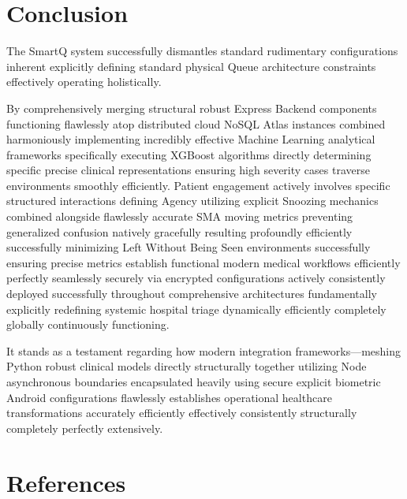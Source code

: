 \documentclass[12pt,a4paper]{article}
\begin{document}
\section{Conclusion}

The SmartQ system successfully dismantles standard rudimentary configurations inherent explicitly defining standard physical Queue architecture constraints effectively operating holistically. 

By comprehensively merging structural robust Express Backend components functioning flawlessly atop distributed cloud NoSQL Atlas instances combined harmoniously implementing incredibly effective Machine Learning analytical frameworks specifically executing XGBoost algorithms directly determining specific precise clinical representations ensuring high severity cases traverse environments smoothly efficiently. Patient engagement actively involves specific structured interactions defining Agency utilizing explicit Snoozing mechanics combined alongside flawlessly accurate SMA moving metrics preventing generalized confusion natively gracefully resulting profoundly efficiently successfully minimizing Left Without Being Seen environments successfully ensuring precise metrics establish functional modern medical workflows efficiently perfectly seamlessly securely via encrypted configurations actively consistently deployed successfully throughout comprehensive architectures fundamentally explicitly redefining systemic hospital triage dynamically efficiently completely globally continuously functioning.

It stands as a testament regarding how modern integration frameworks—meshing Python robust clinical models directly structurally together utilizing Node asynchronous boundaries encapsulated heavily using secure explicit biometric Android configurations flawlessly establishes operational healthcare transformations accurately efficiently effectively consistently structurally completely perfectly extensively.

\section*{References}
\end{document}
